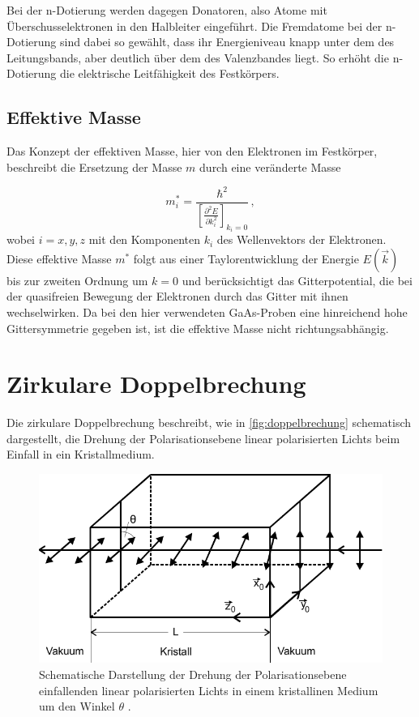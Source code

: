 Bei der n-Dotierung werden dagegen Donatoren, also Atome mit Überschusselektronen in den Halbleiter eingeführt.
Die Fremdatome bei der  n-Dotierung sind dabei so gewählt, dass ihr Energieniveau knapp unter dem des Leitungsbands,
aber deutlich über dem des Valenzbandes liegt.
So erhöht die n-Dotierung die elektrische Leitfähigkeit des Festkörpers.


\subsection{Effektive Masse}

Das Konzept der effektiven Masse, hier von den Elektronen im Festkörper, beschreibt die Ersetzung der Masse $m$ durch eine veränderte Masse

\begin{equation}
    m^*_i = \frac{\hbar^2}{\left[\frac{\partial^2 E}{\partial k^2_i} \right]_{k_i=0}} \,,
    \label{eq:effektivemasse}
\end{equation}
wobei $i = x,y,z$ mit den Komponenten $k_i$ des Wellenvektors der Elektronen.
Diese effektive Masse $m^*$ folgt aus einer Taylorentwicklung der Energie $E(\vec{k})$ bis zur zweiten Ordnung um $k=0$ und berücksichtigt das Gitterpotential,
die bei der quasifreien Bewegung der Elektronen durch das Gitter mit ihnen wechselwirken.
Da bei den hier verwendeten GaAs-Proben eine hinreichend hohe Gittersymmetrie gegeben ist, ist die effektive Masse nicht richtungsabhängig.


\section{Zirkulare Doppelbrechung}

Die zirkulare Doppelbrechung beschreibt, wie in \autoref{fig:doppelbrechung} schematisch dargestellt,
die Drehung der Polarisationsebene linear polarisierten Lichts beim Einfall in ein Kristallmedium.

\begin{figure}[H]
    \centering
    \includegraphics[width=.6\textwidth]{figures/doppelbrechung.pdf}
    \caption{Schematische Darstellung der Drehung der Polarisationsebene einfallenden linear polarisierten Lichts in einem kristallinen Medium um den Winkel $\theta$ \cite{doppbre}.}
    \label{fig:doppelbrechung}
\end{figure}

